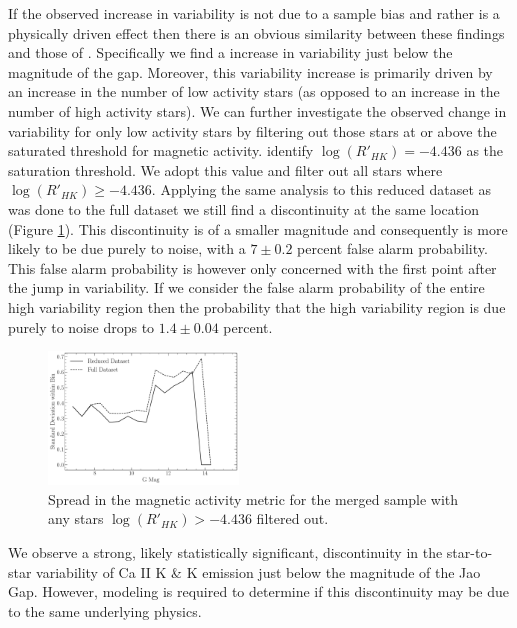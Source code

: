 If the observed increase in variability is not due to a sample bias and rather
is a physically driven effect then there is an obvious similarity between these
findings and those of \citep{Jao2023}. Specifically we find a increase in
variability just below the magnitude of the gap. Moreover, this variability
increase is primarily driven by an increase in the number of low activity stars
(as opposed to an increase in the number of high activity stars). We can
further investigate the observed change in variability for only low activity
stars by filtering out those stars at or above the saturated threshold for
magnetic activity. \citet{Boudreaux2022} identify $\log(R'_{HK}) = -4.436$ as
the saturation threshold. We adopt this value and filter out all stars where
$\log(R'_{HK}) \geq -4.436$. Applying the same analysis to this reduced dataset
as was done to the full dataset we still find a discontinuity at the same
location (Figure \ref{fig:reduced}). This discontinuity is of a smaller
magnitude and consequently is more likely to be due purely to noise, with a
$7\pm0.2$ percent false alarm probability. This false alarm probability is
however only concerned with the first point after the jump in variability. If
we consider the false alarm probability of the entire high variability region
then the probability that the high variability region is due purely to noise
drops to $1.4\pm0.04$ percent.

\begin{figure}
  \centering
  \includegraphics[width=0.45\textwidth]{figures/ReducedDeviation.pdf}
  \caption{Spread in the magnetic activity metric for the merged sample with
  any stars $\log(R'_{HK}) > -4.436$ filtered out.}
  \label{fig:reduced}
\end{figure}

We observe a strong, likely statistically significant, discontinuity in the
star-to-star variability of Ca II K \& K emission just below the magnitude
of the Jao Gap. However, modeling is required to determine if this discontinuity
may be due to the same underlying physics.

